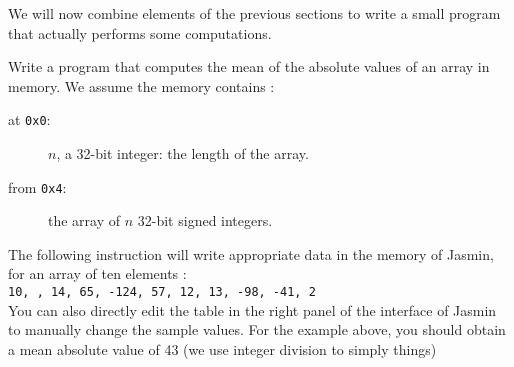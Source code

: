 \documentclass{../../tp}
\begin{document}
We will now combine elements of the previous sections to write a small program that actually performs some computations. 

\begin{instruction}

Write a program that computes the mean of the absolute values of an array in memory.  
We assume the memory contains :
\begin{description}
	\item[at \texttt{0x0}:] $n$, a 32-bit integer: the length of the array.
	\item[from \texttt{0x4}:] the array of $n$ 32-bit signed integers.
\end{description}
 	 
The following instruction will write appropriate data in the memory of \textsf{Jasmin}, for an array of ten elements : \\

 \qquad \texttt{10, ,  14,  65, -124, 57, 12, 13, -98, -41, 2} \\
 
	  
You can also directly edit the table in the right panel of the interface of \textsf{Jasmin} to manually change the sample values. For the example above, you should obtain a mean absolute value of 43 (we use integer division to simply things)
\end{instruction}
\end{document}
